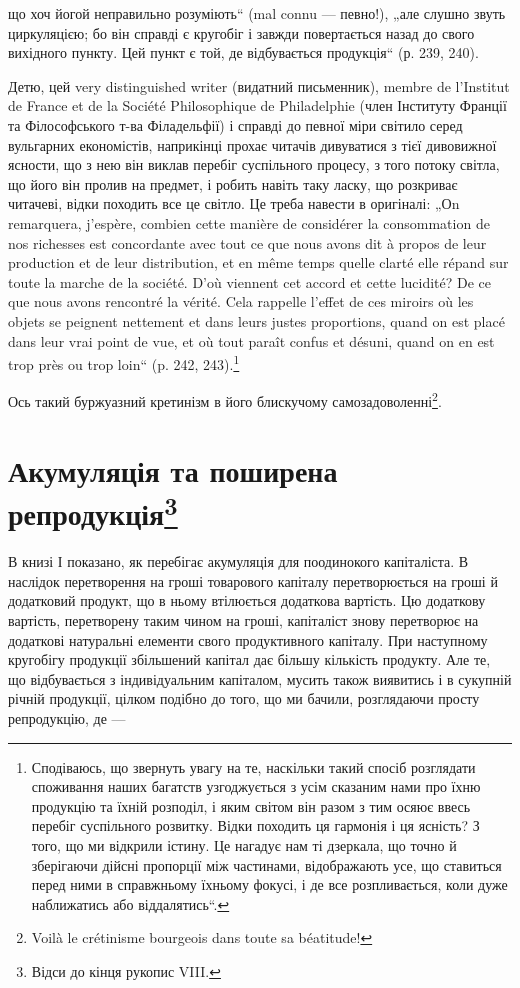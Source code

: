 \parcont{}  %
що хоч йогой неправильно розуміють“ (mal connu — певно!), „але слушно звуть циркуляцією; бо він
справді є кругобіг і завжди повертається назад до свого вихідного пункту. Цей пункт є той, де
відбувається продукція“ (р. 239, 240).

Детю, цей very distinguished writer (видатний письменник), membre de l’Institut de France et de la
Société Philosophique de Philadelphie (член Інституту Франції та Філософського т-ва Філадельфії) і
справді до певної міри світило серед вульгарних економістів, наприкінці прохає читачів дивуватися з
тієї дивовижної ясности, що з нею він виклав перебіг суспільного процесу, з того потоку світла, що
його він пролив на предмет, і робить навіть таку ласку, що розкриває читачеві, відки походить все це
світло. Це треба навести в оригіналі: „Оn remarquera, j’espère, combien cette manière de considérer
la consommation de nos richesses est concordante avec tout ce que nous avons dit à propos de leur
production et de leur distribution, et en même temps quelle clarté elle répand sur toute la marche
de la société. D'où viennent cet accord et cette lucidité? De ce que nous avons rencontré la vérité.
Cela rappelle l’effet de ces miroirs où les objets se peignent nettement et dans leurs justes
proportions, quand on est placé dans leur vrai point de vue, et où tout paraît confus et désuni,
quand on en est trop près ou trop loin“ (p. 242, 243).\footnote*{
Сподіваюсь, що звернуть увагу на те, наскільки такий спосіб розглядати споживання наших багатств
узгоджується з усім сказаним нами про їхню продукцію та їхній розподіл, і яким світом він разом з
тим осяює ввесь перебіг суспільного розвитку. Відки походить ця гармонія і ця ясність? З того, що ми
відкрили істину. Це нагадує нам ті дзеркала, що точно й зберігаючи дійсні пропорції між частинами,
відображають усе, що ставиться перед ними в справжньому їхньому фокусі, і де все розпливається, коли
дуже наближатись або віддалятись“.
}

Ось такий буржуазний кретинізм в його блискучому самозадоволенні\footnote*{
Voilà le crétinisme bourgeois dans toute sa béatitude!
}.

\section{Акумуляція та поширена репродукція\footnote{
Відси до кінця рукопис VIII.
}}

В книзі І показано, як перебігає акумуляція для поодинокого капіталіста. В наслідок перетворення на
гроші товарового капіталу перетворюється на гроші й додатковий продукт, що в ньому втілюється
додаткова вартість. Цю додаткову вартість, перетворену таким чином на гроші, капіталіст знову
перетворює на додаткові натуральні елементи свого продуктивного капіталу. При наступному кругобігу
продукції збільшений капітал дає більшу кількість продукту. Але те, що відбувається з індивідуальним
капіталом, мусить також виявитись і в сукупній річній продукції, цілком подібно до того, що ми
бачили, розглядаючи просту репродукцію, де —
\parbreak{}  %
